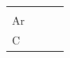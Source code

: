\begin{enumerate}[noitemsep, label=\textbf{\arabic*}. ]
{\begin{center}
\begin{xtabular*}{\mytablewidth}[t]{|p{10\mystarwidth}|p{10\mystarwidth}|p{10\mystarwidth}|p{10\mystarwidth}|}
    
         &
    
    
         &
    
    
     \tabularnewline{}
    
    
        \begin{math}\mathrm{Ar}\end{math} &
    
    
         &
    
    
         &
    
    
     \tabularnewline{}
    
    
        \begin{math}\mathrm{C}\end{math} &
    

\end{xtabular*}
\end{center}}
\end{enumerate}
